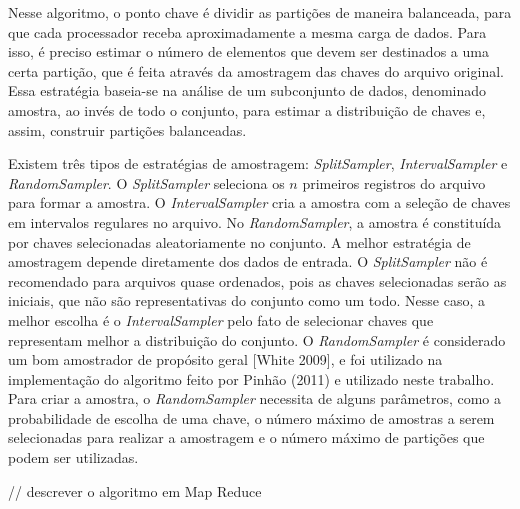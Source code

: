Nesse algoritmo, o ponto chave é dividir as partições de maneira balanceada, para que cada processador receba aproximadamente a mesma carga de dados. Para isso, é preciso estimar o número de elementos que devem ser destinados a uma certa partição, que é feita através da amostragem das chaves do arquivo original. Essa estratégia baseia-se na análise de um subconjunto de dados, denominado amostra, ao invés de todo o conjunto, para estimar a distribuição de chaves e, assim, construir partições balanceadas.

Existem três tipos de estratégias de amostragem: \textit{SplitSampler}, \textit{IntervalSampler} e \textit{RandomSampler}. O \textit{SplitSampler} seleciona os $n$ primeiros registros do arquivo para formar a amostra. O \textit{IntervalSampler} cria a amostra com a seleção de chaves em intervalos regulares no arquivo. No \textit{RandomSampler}, a amostra é constituída por chaves selecionadas aleatoriamente no conjunto. A melhor estratégia de amostragem depende diretamente dos dados de entrada. O \textit{SplitSampler} não é recomendado para arquivos quase ordenados, pois as chaves selecionadas serão as iniciais, que não são representativas do conjunto como um todo. Nesse caso, a melhor escolha é o \textit{IntervalSampler} pelo fato de selecionar chaves que representam melhor a distribuição do conjunto. O \textit{RandomSampler} é considerado um bom amostrador de propósito geral [White 2009], e foi utilizado na implementação do algoritmo feito por Pinhão (2011) e utilizado neste trabalho.
Para criar a amostra, o \textit{RandomSampler} necessita de alguns parâmetros, como a probabilidade de escolha de uma chave, o número máximo de amostras a serem selecionadas para realizar a amostragem e o número máximo de partições que podem ser utilizadas.

// descrever o algoritmo em Map Reduce
%

